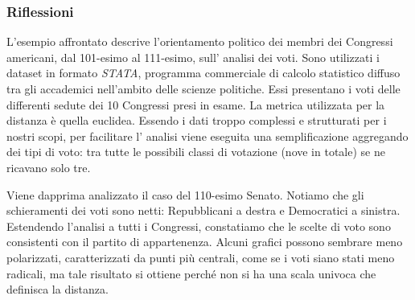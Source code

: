 			\subsubsection{Riflessioni }		
				L'esempio affrontato descrive l'orientamento politico dei membri dei Congressi americani, dal 101-esimo al 111-esimo, sull' analisi dei voti.
				Sono utilizzati i dataset in formato \emph{STATA}, programma commerciale di calcolo statistico diffuso tra gli accademici nell'ambito delle scienze politiche. Essi presentano i voti delle differenti sedute dei 10 Congressi presi in esame. 
				La metrica utilizzata per la distanza è quella euclidea.
				Essendo i dati troppo complessi e strutturati per i nostri scopi, per facilitare l' analisi viene eseguita una semplificazione aggregando dei tipi di voto: tra tutte le possibili classi di votazione (nove in totale) se ne ricavano solo tre.\par
				Viene dapprima analizzato il caso del 110-esimo Senato. Notiamo che gli schieramenti dei voti sono netti: Repubblicani a destra e Democratici a sinistra.
				Estendendo l'analisi a tutti i Congressi, constatiamo che le scelte di voto sono consistenti con il partito di appartenenza. Alcuni grafici possono sembrare meno polarizzati, caratterizzati da punti più centrali, come se i voti siano stati meno radicali, ma tale risultato si ottiene perché non si ha una scala univoca che definisca la distanza.
